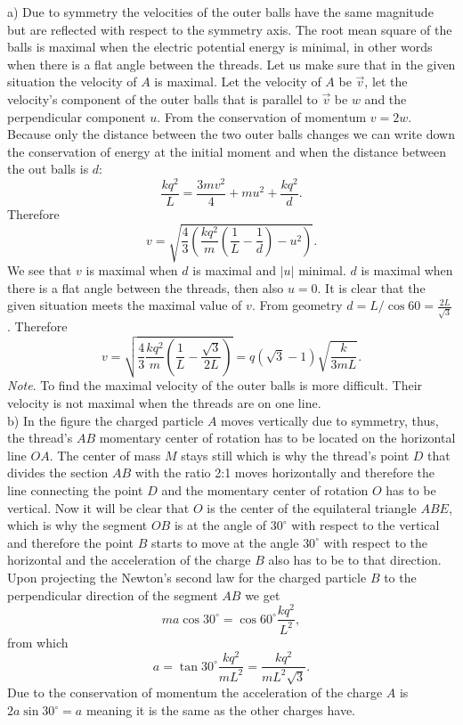 \documentclass[11pt]{article}
\begin{document}
\solueng
a) Due to symmetry the velocities of the outer balls have the same magnitude but are reflected with respect to the symmetry axis. The root mean square of the balls is maximal when the electric potential energy is minimal, in other words when there is a flat angle between the threads. Let us make sure that in the given situation the velocity of $A$ is maximal. Let the velocity of $A$ be $\vec v$, let the velocity’s component of the outer balls that is parallel to $\vec v$ be $w$ and the perpendicular component $u$. From the conservation of momentum $v = 2w$. Because only the distance between the two outer balls changes we can write down the conservation of energy at the initial moment and when the distance between the out balls is $d$:
\[
\frac{kq^2}{L} = \frac{3mv^2}{4} + mu^2 + \frac{kq^2}{d}.
\] 
Therefore
\[
v = \sqrt{\frac{4}{3}\left(\frac{kq^2}{m}\left(\frac{1}{L} - \frac{1}{d}\right) - u^2\right)}.
\] 
We see that $v$ is maximal when $d$ is maximal and $|u|$ minimal. $d$ is maximal when there is a flat angle between the threads, then also $u = 0$. It is clear that the given situation meets the maximal value of $v$. From geometry $d = L/\cos 60 = \frac{2L}{\sqrt 3}$. Therefore
\[
v = \sqrt{\frac{4}{3}\frac{kq^2}{m}\left(\frac{1}{L}-\frac{\sqrt{3}}{2L}\right)} = q\left(\sqrt{3} - 1\right)\sqrt{\frac{k}{3mL}}.
\] 
\emph{Note}. To find the maximal velocity of the outer balls is more difficult. Their velocity is not maximal when the threads are on one line.\\
b) In the figure the charged particle $A$ moves vertically due to symmetry, thus, the thread’s $AB$ momentary center of rotation has to be located on the horizontal line $OA$. The center of mass $M$ stays still which is why the thread’s point $D$ that divides the section $AB$ with the ratio 2:1 moves horizontally and therefore the line connecting the point $D$ and the momentary center of rotation $O$ has to be vertical. Now it will be clear that $O$ is the center of the equilateral triangle $ABE$, which is why the segment $OB$ is at the angle of $30^\circ$ with respect to the vertical and therefore the point $B$ starts to move at the angle $30^\circ$ with respect to the horizontal and the acceleration of the charge $B$ also has to be to that direction. Upon projecting the Newton’s second law for the charged particle $B$ to the perpendicular direction of the segment $AB$ we get
$$ma\cos 30^\circ=\cos 60^\circ  \frac{kq^2}{L^2},$$ 
from which 
$$a=\tan 30^\circ \frac{kq^2}{mL^2}=\frac{kq^2}{mL^2\sqrt 3}.$$ 
Due to the conservation of momentum the acceleration of the charge $A$ is $2a\sin30^\circ=a$ meaning it is the same as the other charges have.
\probend
\bigskip
\end{document}
